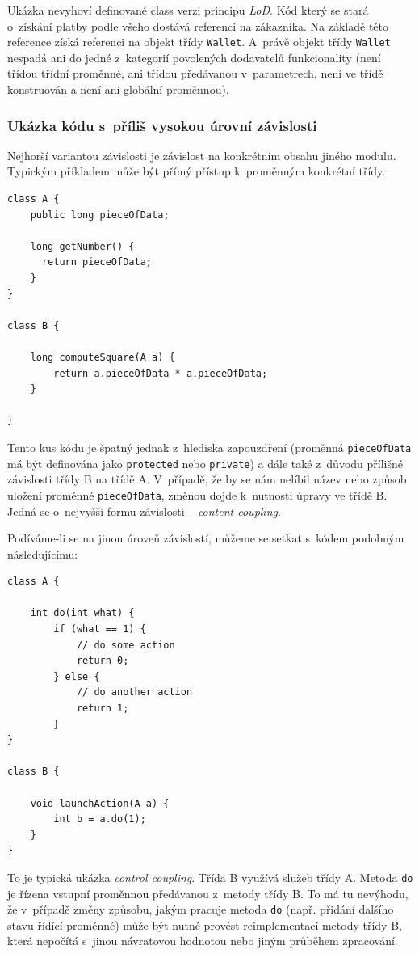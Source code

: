 Ukázka nevyhoví definované class verzi principu \emph{LoD}. Kód který se stará o~získání platby podle všeho dostává referenci na zákazníka. Na základě této reference získá referenci na objekt třídy \verb+Wallet+. A~právě objekt třídy \verb+Wallet+ nespadá ani do jedné z~kategorií povolených dodavatelů funkcionality (není třídou třídní proměnné, ani třídou předávanou v~parametrech, není ve třídě konstruován a není ani globální proměnnou).

\subsubsection{Ukázka kódu s~příliš vysokou úrovní závislosti}
Nejhorší variantou závislosti je závislost na konkrétním obsahu jiného modulu. Typickým příkladem může být přímý přístup k~proměnným konkrétní třídy.

\begin{lstlisting}
class A {
    public long pieceOfData;

    long getNumber() {
      return pieceOfData;
    }
}

class B {

    long computeSquare(A a) {
        return a.pieceOfData * a.pieceOfData;
    }

}
\end{lstlisting}

Tento kus kódu je špatný jednak z~hlediska zapouzdření (proměnná \verb+pieceOfData+ má být definována jako \verb+protected+ nebo \verb+private+) a dále také z~důvodu přílišné závislosti třídy B na třídě A. V~případě, že by se nám nelíbil název nebo způsob uložení proměnné \verb+pieceOfData+, změnou dojde k~nutnosti úpravy ve třídě B. Jedná se o~nejvyšší formu závislosti -- \emph{content coupling}.

Podíváme-li se na jinou úroveň závislostí, můžeme se setkat s~kódem podobným následujícímu:

\begin{lstlisting}
class A {

    int do(int what) {
        if (what == 1) {
            // do some action
            return 0;
        } else {
            // do another action
            return 1;
        }
}

class B {

    void launchAction(A a) {
        int b = a.do(1);
    }
}
\end{lstlisting}

To je typická ukázka \emph{control coupling}. Třída B využívá služeb třídy A. Metoda \verb+do+ je řízena vstupní proměnnou předávanou z~metody třídy B. To má tu nevýhodu, že v~případě změny způsobu, jakým pracuje metoda \verb+do+ (např. přidání dalšího stavu řídící proměnné) může být nutné provést reimplementaci metody třídy B, která nepočítá s~jinou návratovou hodnotou nebo jiným průběhem zpracování.

